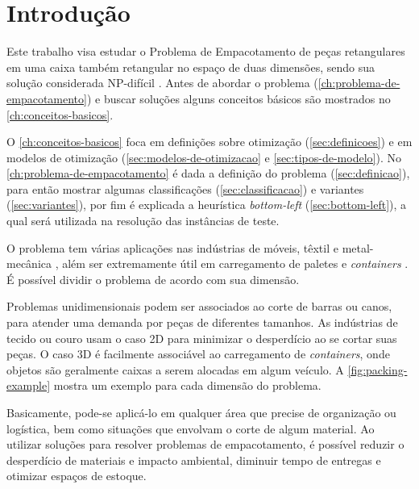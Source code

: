 \chapter*[Introdução]{Introdução}\label{ch:introducao}

Este trabalho visa estudar o Problema de Empacotamento de peças retangulares em uma caixa também retangular no espaço de duas dimensões, sendo sua solução considerada NP-difícil \cite{2DPackLib}.
Antes de abordar o problema (\autoref{ch:problema-de-empacotamento}) e buscar soluções alguns conceitos básicos são mostrados no \autoref{ch:conceitos-basicos}.

O \autoref{ch:conceitos-basicos} foca em definições sobre otimização (\autoref{sec:definicoes}) e em modelos de otimização (\autoref{sec:modelos-de-otimizacao} e \autoref{sec:tipos-de-modelo}).
No \autoref{ch:problema-de-empacotamento} é dada a definição do problema (\autoref{sec:definicao}), para então mostrar algumas classificações (\autoref{sec:classificacao}) e variantes (\autoref{sec:variantes}), por fim é explicada a heurística \textit{bottom-left} (\autoref{sec:bottom-left}), a qual será utilizada na resolução das instâncias de teste.

O problema tem várias aplicações nas indústrias de móveis, têxtil e metal-mecânica \cite{queiroz2022estudo, cavali2004problemas, belluzzo2005otimizacao}, além ser extremamente útil em carregamento de paletes e \textit{containers} \cite{morabito1992abordagem}.
É possível dividir o problema de acordo com sua dimensão.

Problemas unidimensionais podem ser associados ao corte de barras ou canos, para atender uma demanda por peças de diferentes tamanhos.
As indústrias de tecido ou couro usam o caso 2D para minimizar o desperdício ao se cortar suas peças.
O caso 3D é facilmente associável ao carregamento de \textit{containers}, onde objetos são geralmente caixas a serem alocadas em algum veículo.
A \autoref{fig:packing-example} mostra um exemplo para cada dimensão do problema.

Basicamente, pode-se aplicá-lo em qualquer área que precise de organização ou logística, bem como situações que envolvam o corte de algum material.
Ao utilizar soluções para resolver problemas de empacotamento, é possível reduzir o desperdício de materiais e impacto ambiental, diminuir tempo de entregas e otimizar espaços de estoque.





